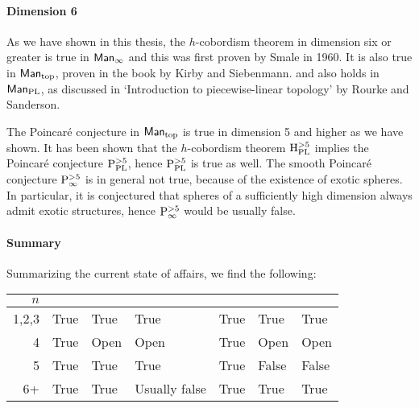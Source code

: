 
\paragraph{Dimension 6}

As we have shown in this thesis, the $h$-cobordism theorem in dimension six or greater is true in $\textsf{Man}_{\infty}$ and this was first proven by Smale in 1960.
It is also true in $\textsf{Man}_{\text{top}}$, proven in the book by Kirby and Siebenmann. and also holds in $\textsf{Man}_{\text{PL}}$, as discussed in `Introduction to piecewise-linear topology' by Rourke and Sanderson.

The Poincaré conjecture in $\textsf{Man}_{\text{top}}$ is true in dimension 5 and higher as we have shown.
It has been shown that the $h$-cobordism theorem $\mathrm H_{\text{PL}}^{>5}$ implies the Poincaré conjecture $\mathrm P_{\text{PL}}^{>5}$, hence $\mathrm P_{\text{PL}}^{>5}$ is true as well.
The smooth Poincaré conjecture $\mathrm P_{\infty}^{>5}$ is in general not true, because of the existence of exotic spheres.
In particular, it is conjectured that spheres of a sufficiently high dimension always admit exotic structures, hence $\mathrm P_{\infty}^{>5}$ would be usually false.


\paragraph{Summary}
Summarizing the current state of affairs, we find the following:

\begin{center}
    \begin{tabular}{
            r
            >{\centering\arraybackslash}p{1.1cm}%
            >{\centering\arraybackslash}p{1.1cm}%
            >{\centering\arraybackslash}p{1.8cm}%
            >{\centering\arraybackslash}p{1.1cm}%
            >{\centering\arraybackslash}p{1.1cm}%
            >{\centering\arraybackslash}p{1.1cm}}
            $n$& \tpoinc{} & \ppoinc{} & \spoinc{} & \tcob{} & \pcob{} & \scob{}\\ \midrule
            1,2,3 &
            True & 
            True & 
            True &  
            True & 
            True & 
            True  \\
            4 &
            True & 
            Open & 
            Open&  
            True & 
            Open& 
            Open \\
            5 &
            True & 
            True & 
            True &  
            True & 
            False& 
            False \\
            6+ &
            True & 
            True & 
            Usually false&  
            True & 
            True& 
            True\\
    \end{tabular}
\end{center}
